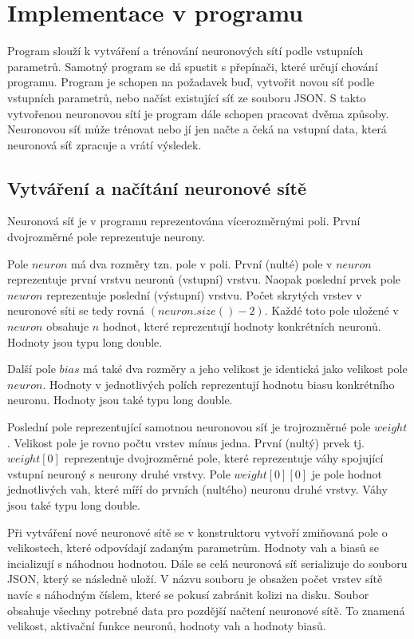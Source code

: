 \section{Implementace v programu}
Program slouží k vytváření a trénování neuronových sítí podle vstupních parametrů.
Samotný program se dá spustit s přepínači, které určují chování programu.
Program je schopen na požadavek buď, vytvořit novou síť podle vstupních parametrů, nebo načíst existující síť ze souboru JSON.
S takto vytvořenou neuronovou sítí je program dále schopen pracovat dvěma způsoby.
Neuronovou síť může trénovat nebo jí jen načte a čeká na vstupní data, která neuronová síť zpracuje a vrátí výsledek.

\subsection{Vytváření a načítání neuronové sítě}
Neuronová síť je v programu reprezentována vícerozměrnými poli. První dvojrozměrné pole reprezentuje neurony.

Pole \(neuron\) má dva rozměry tzn. pole v poli.
První (nulté) pole v \(neuron\) reprezentuje první vrstvu neuronů (vstupní) vrstvu.
Naopak poslední prvek pole \(neuron\) reprezentuje poslední (výstupní) vrstvu.
Počet skrytých vrstev v neuronové síti se tedy rovná \((neuron.size() - 2)\).
Každé toto pole uložené v \(neuron\) obsahuje \(n\) hodnot, které reprezentují hodnoty konkrétních neuronů. Hodnoty jsou typu long double.

Další pole \(bias\) má také dva rozměry a jeho velikost je identická jako velikost pole \(neuron\).
Hodnoty v jednotlivých polích reprezentují hodnotu biasu konkrétního neuronu. Hodnoty jsou také typu long double.

Poslední pole reprezentující samotnou neuronovou síť je trojrozměrné pole \(weight\). Velikost pole je rovno počtu vrstev mínus jedna.
První (nultý) prvek tj. \(weight[0]\) reprezentuje dvojrozměrné pole, které reprezentuje váhy spojující vstupní neuroný s neurony druhé vrstvy.
Pole \(weight[0][0]\) je pole hodnot jednotlivých vah, které míří do prvních (nultého) neuronu druhé vrstvy. Váhy jsou také typu long double.

Při vytváření nové neuronové sítě se v konstruktoru vytvoří zmiňovaná pole o velikostech, které odpovídají zadaným parametrům.
Hodnoty vah a biasů se incializují s náhodnou hodnotou. Dále se celá neuronová síť serializuje do souboru JSON, který se následně uloží.
V názvu souboru je obsažen počet vrstev sítě navíc s náhodným číslem, které se pokusí zabránit kolizi na disku.
Soubor obsahuje všechny potrebné data pro pozdější načtení neuronové sítě.
To znamená velikost, aktivační funkce neuronů, hodnoty vah a hodnoty biasů.


